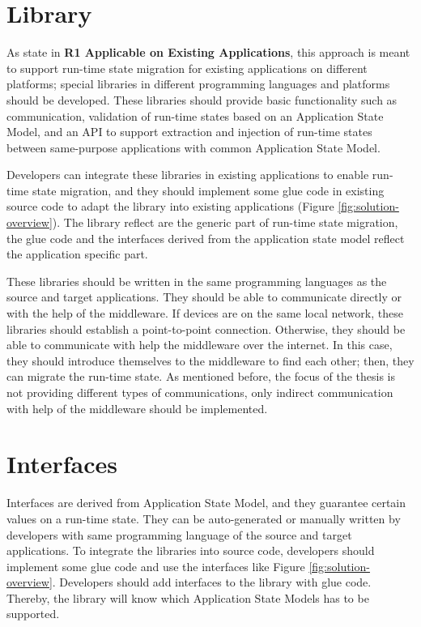 \section{Library}
As state in \textbf{R1 Applicable on Existing Applications}, this approach is meant to support run-time state migration for existing applications on different platforms; special libraries in different programming languages and platforms should be developed. 
These libraries should provide basic functionality such as communication, validation of run-time states based on an Application State Model, and an API to support extraction and injection of run-time states between same-purpose applications with common Application State Model.

Developers can integrate these libraries in existing applications to enable run-time state migration, and they should implement some glue code in existing source code to adapt the library into existing applications (Figure \ref{fig:solution-overview}). The library reflect are the generic part of run-time state migration, the glue code and the interfaces derived from the application state model reflect the application specific part.

These libraries should be written in the same programming languages as the source and target applications. They should be able to communicate directly or with the help of the middleware.
If devices are on the same local network, these libraries should establish a point-to-point connection.
Otherwise, they should be able to communicate with help the middleware over the internet.
In this case, they should introduce themselves to the middleware to find each other; then, they can migrate the run-time state. As mentioned before, the focus of the thesis is not providing different types of communications, only indirect communication with help of the middleware should be implemented.


\section{Interfaces}
Interfaces are derived from Application State Model, and they guarantee certain values on a run-time state. They can be auto-generated or manually written by developers with same programming language of the source and target applications.
To integrate the libraries into source code, developers should implement some glue code and use the interfaces like Figure \ref{fig:solution-overview}. Developers should add interfaces to the library with glue code. Thereby, the library will know which Application State Models has to be supported.

